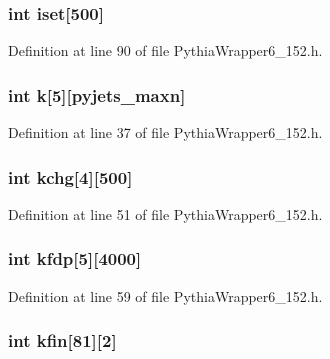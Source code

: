 \subsubsection{\setlength{\rightskip}{0pt plus 5cm}int {\bf iset}[500]}\label{PythiaWrapper6__152_8h_0542396ef721435b4813e679952115f2}




Definition at line 90 of file Pythia\-Wrapper6\_\-152.h.
\subsubsection{\setlength{\rightskip}{0pt plus 5cm}int {\bf k}[5][{\bf pyjets\_\-maxn}]}\label{PythiaWrapper6__152_8h_93d2c477252003afeb74ae6ca06fc2ec}




Definition at line 37 of file Pythia\-Wrapper6\_\-152.h.
\subsubsection{\setlength{\rightskip}{0pt plus 5cm}int {\bf kchg}[4][500]}\label{PythiaWrapper6__152_8h_88a7d616ffc6c46cccd0763fd6263b0c}




Definition at line 51 of file Pythia\-Wrapper6\_\-152.h.
\subsubsection{\setlength{\rightskip}{0pt plus 5cm}int {\bf kfdp}[5][4000]}\label{PythiaWrapper6__152_8h_ae2c9ba6781332f5ffbea44d91fefe5f}




Definition at line 59 of file Pythia\-Wrapper6\_\-152.h.
\subsubsection{\setlength{\rightskip}{0pt plus 5cm}int {\bf kfin}[81][2]}\label{PythiaWrapper6__152_8h_456aeb577e9c3538f109a4d33b70d79d}




